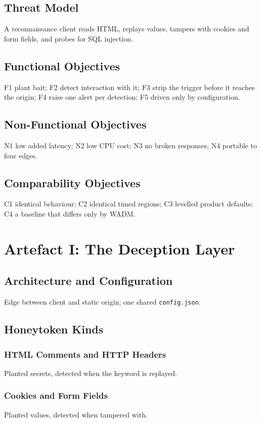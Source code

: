 \documentclass{rptuma}
\begin{document}
\section{Threat Model}
A reconnaissance client reads HTML, replays values, tampers with cookies and form fields, and
probes for SQL injection.

\section{Functional Objectives}
F1 plant bait; F2 detect interaction with it; F3 strip the trigger before it reaches the origin;
F4 raise one alert per detection; F5 driven only by configuration.

\section{Non-Functional Objectives}
N1 low added latency; N2 low CPU cost; N3 no broken responses; N4 portable to four edges.

\section{Comparability Objectives}
C1 identical behaviour; C2 identical timed regions; C3 levelled product defaults; C4 a baseline
that differs only by WADM.

\chapter{Artefact I: The Deception Layer}
\section{Architecture and Configuration}
Edge between client and static origin; one shared \texttt{config.json}.
\section{Honeytoken Kinds}
\subsection{HTML Comments and HTTP Headers}
Planted secrets, detected when the keyword is replayed.
\subsection{Cookies and Form Fields}
Planted values, detected when tampered with.
\end{document}
